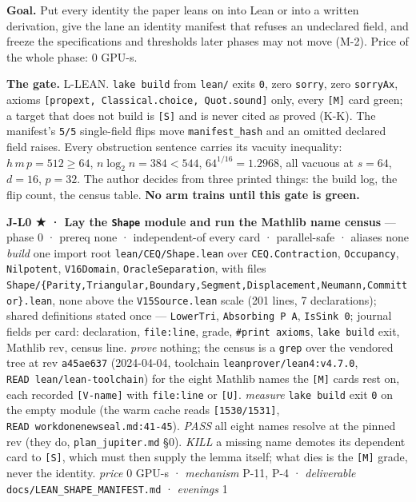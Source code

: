 \documentclass[11pt,a4paper]{article}
\newcounter{none}                 %
\theoremstyle{plain}
\theoremstyle{definition}
\theoremstyle{remark}
\begin{document}
\textbf{Goal.} Put every identity the paper leans on into Lean or into a
written derivation, give the lane an identity manifest that refuses an
undeclared field, and freeze the specifications and thresholds later
phases may not move (M-2). Price of the whole phase: \(0\) GPU-s.

\textbf{The gate.} L-LEAN. \texttt{lake\ build} from \texttt{lean/}
exits \texttt{0}, zero \texttt{sorry}, zero \texttt{sorryAx}, axioms
\texttt{{[}propext,\ Classical.choice,\ Quot.sound{]}} only, every
\texttt{{[}M{]}} card green; a target that does not build is
\texttt{{[}S{]}} and is never cited as proved (K-K). The manifest's
\texttt{5/5} single-field flips move \texttt{manifest\_hash} and an
omitted declared field raises. Every obstruction sentence carries its
vacuity inequality: \(h\,m\,p=512\ge64\), \(n\log_2 n=384<544\),
\(64^{1/16}=1.2968\), all vacuous at \(s=64\), \(d=16\), \(p=32\). The
author decides from three printed things: the build log, the flip count,
the census table. \textbf{No arm trains until this gate is green.}

\textbf{J-L0 ★ · Lay the \texttt{Shape} module and run the Mathlib name
census} --- phase 0 · prereq none · independent-of every card ·
parallel-safe · aliases none \emph{build} one import root
\texttt{lean/CEQ/Shape.lean} over \texttt{CEQ.Contraction},
\texttt{Occupancy}, \texttt{Nilpotent}, \texttt{V16Domain},
\texttt{OracleSeparation}, with files
\texttt{Shape/\{Parity,Triangular,Boundary,Segment,Displacement,Neumann,Committor\}.lean},
none above the \texttt{V15Source.lean} scale (201 lines, 7
declarations); shared definitions stated once --- \texttt{LowerTri},
\texttt{Absorbing\ P\ A}, \texttt{IsSink\ 0}; journal fields per card:
declaration, \texttt{file:line}, grade, \texttt{\#print\ axioms},
\texttt{lake\ build} exit, Mathlib rev, census line. \emph{prove}
nothing; the census is a \texttt{grep} over the vendored tree at rev
\texttt{a45ae637} (2024-04-04, toolchain
\texttt{leanprover/lean4:v4.7.0}, \texttt{READ\ lean/lean-toolchain})
for the eight Mathlib names the \texttt{{[}M{]}} cards rest on, each
recorded \texttt{{[}V-name{]}} with \texttt{file:line} or
\texttt{{[}U{]}}. \emph{measure} \texttt{lake\ build} exit \texttt{0} on
the empty module (the warm cache reads \texttt{{[}1530/1531{]}},
\texttt{READ\ workdonenewseal.md:41-45}). \emph{PASS} all eight names
resolve at the pinned rev (they do, \texttt{plan\_jupiter.md} §0).
\emph{KILL} a missing name demotes its dependent card to
\texttt{{[}S{]}}, which must then supply the lemma itself; what dies is
the \texttt{{[}M{]}} grade, never the identity. \emph{price} \(0\) GPU-s
· \emph{mechanism} P-11, P-4 · \emph{deliverable}
\texttt{docs/LEAN\_SHAPE\_MANIFEST.md} · \emph{evenings} 1
\end{document}
